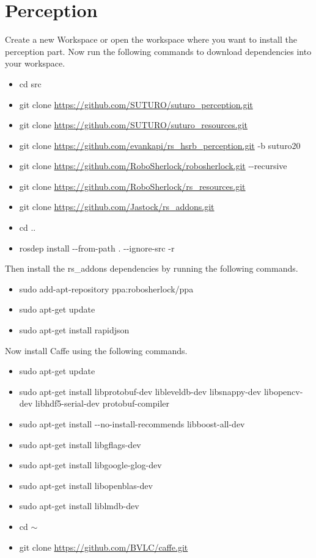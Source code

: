 \documentclass[main.tex]{subfiles}
\begin{document}
 \section{Perception}
 Create a new Workspace or open the workspace where you want to install the perception part. Now run the following commands to download dependencies into your workspace.
 
 \begin{itemize}
\item cd src
\item git clone \url{https://github.com/SUTURO/suturo_perception.git}
\item git clone \url{https://github.com/SUTURO/suturo_resources.git} 
\item git clone \url{https://github.com/evankapi/rs_hsrb_perception.git} -b suturo20
\item git clone \url{https://github.com/RoboSherlock/robosherlock.git} -{}-recursive
\item git clone \url{https://github.com/RoboSherlock/rs_resources.git}
\item git clone \url{https://github.com/Jastock/rs_addons.git}
\item cd ..
\item rosdep install -{}-from-path . -{}-ignore-src -r 
\end{itemize}
 
 Then install the rs\_addons dependencies by running the following commands.
 \begin{itemize}
\item sudo add-apt-repository ppa:robosherlock/ppa
\item sudo apt-get update
\item sudo apt-get install rapidjson 
 \end{itemize}
 
 Now install Caffe using the following commands.
 \begin{itemize}
\item sudo apt-get update
\item sudo apt-get install libprotobuf-dev libleveldb-dev libsnappy-dev libopencv-dev libhdf5-serial-dev protobuf-compiler
\item sudo apt-get install -{}-no-install-recommends libboost-all-dev
\item sudo apt-get install libgflags-dev
\item sudo apt-get install libgoogle-glog-dev
\item sudo apt-get install libopenblas-dev
\item sudo apt-get install liblmdb-dev
\item cd $\sim$
\item git clone \url{https://github.com/BVLC/caffe.git}
 \end{itemize}
 
\end{document}
